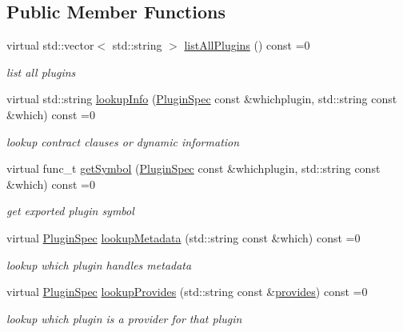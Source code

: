 \subsection*{Public Member Functions}
\begin{DoxyCompactItemize}
\item 
virtual std\+::vector$<$ std\+::string $>$ \mbox{\hyperlink{classkdb_1_1tools_1_1PluginDatabase_adc1f43ccefdd7fc15a57db7571420642}{list\+All\+Plugins}} () const =0
\begin{DoxyCompactList}\small\item\em list all plugins \end{DoxyCompactList}\item 
virtual std\+::string \mbox{\hyperlink{classkdb_1_1tools_1_1PluginDatabase_ac0af2ec31a98f4176c19eaf34977abbe}{lookup\+Info}} (\mbox{\hyperlink{classkdb_1_1tools_1_1PluginSpec}{Plugin\+Spec}} const \&whichplugin, std\+::string const \&which) const =0
\begin{DoxyCompactList}\small\item\em lookup contract clauses or dynamic information \end{DoxyCompactList}\item 
virtual func\+\_\+t \mbox{\hyperlink{classkdb_1_1tools_1_1PluginDatabase_a87b5ef6ee66ce1ad46cc590a2b60b9fa}{get\+Symbol}} (\mbox{\hyperlink{classkdb_1_1tools_1_1PluginSpec}{Plugin\+Spec}} const \&whichplugin, std\+::string const \&which) const =0
\begin{DoxyCompactList}\small\item\em get exported plugin symbol \end{DoxyCompactList}\item 
virtual \mbox{\hyperlink{classkdb_1_1tools_1_1PluginSpec}{Plugin\+Spec}} \mbox{\hyperlink{classkdb_1_1tools_1_1PluginDatabase_a03a416f66d6525f46929e5a68d9db3f7}{lookup\+Metadata}} (std\+::string const \&which) const =0
\begin{DoxyCompactList}\small\item\em lookup which plugin handles metadata \end{DoxyCompactList}\item 
virtual \mbox{\hyperlink{classkdb_1_1tools_1_1PluginSpec}{Plugin\+Spec}} \mbox{\hyperlink{classkdb_1_1tools_1_1PluginDatabase_a43abe56a024218ecee48526ced699f05}{lookup\+Provides}} (std\+::string const \&\mbox{\hyperlink{classkdb_1_1tools_1_1PluginDatabase_afc91ff760616ee83c6afb70e5a2f0601a73ff10d6a07213c277db4326b3df6c4b}{provides}}) const =0
\begin{DoxyCompactList}\small\item\em lookup which plugin is a provider for that plugin \end{DoxyCompactList}\item 

\end{DoxyCompactItemize}
